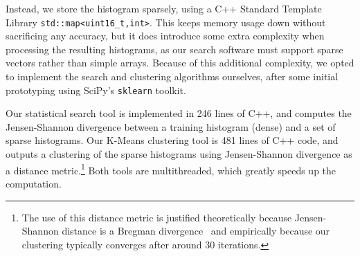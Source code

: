 Instead, we store the histogram sparsely, using a C++ Standard Template
Library \texttt{std::map<uint16\_t,int>}. This keeps memory usage down
without sacrificing any accuracy, but it does introduce some extra
complexity when processing the resulting histograms, as our search
software must support sparse vectors rather than simple arrays. Because
of this additional complexity, we opted to implement the search and
clustering algorithms ourselves, after some initial prototyping using
SciPy's \texttt{sklearn} toolkit.

Our statistical search tool is implemented in 246 lines of C++, and
computes the Jensen-Shannon divergence between a training histogram
(dense) and a set of sparse histograms. Our K-Means clustering tool is
481 lines of C++ code, and outputs a clustering of the sparse histograms
using Jensen-Shannon divergence as a distance metric.\footnote{The use
of this distance metric is justified theoretically because
Jensen-Shannon distance is a Bregman divergence~\cite{Banerjee:2005qf}
and empirically because our clustering typically converges after around
30 iterations.} Both tools are multithreaded, which greatly speeds up the
computation.

